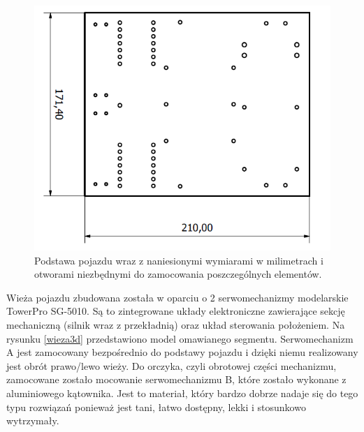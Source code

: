   \begin{figure}[H]
    \begin{center}
      \includegraphics[scale=0.5]{imgs/podstawa.png}
 	\caption[Podstawa pojazdu.]{\small{Podstawa pojazdu wraz z naniesionymi wymiarami w milimetrach i otworami niezbędnymi do zamocowania poszczególnych elementów.}}
	\label{podst3d}
    \end{center}
  \end{figure}
Wieża pojazdu zbudowana została w oparciu o 2 serwomechanizmy modelarskie TowerPro SG-5010. Są to zintegrowane układy elektroniczne zawierające sekcję mechaniczną (silnik wraz z przekładnią) oraz układ sterowania położeniem.
Na rysunku \ref{wieza3d} przedstawiono model omawianego segmentu. Serwomechanizm A jest zamocowany bezpośrednio do podstawy pojazdu i dzięki niemu realizowany jest obrót prawo/lewo wieży. Do orczyka, czyli obrotowej części mechanizmu, zamocowane zostało mocowanie serwomechanizmu B, które zostało wykonane z aluminiowego kątownika. Jest to materiał, który bardzo dobrze nadaje się do tego typu rozwiązań ponieważ jest tani, łatwo dostępny, lekki i stosunkowo wytrzymały.  

